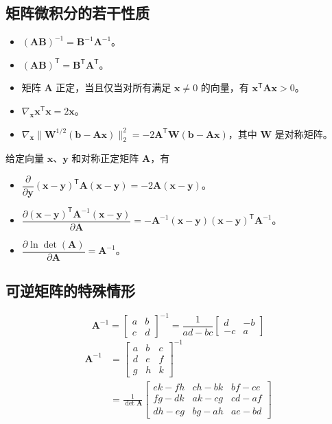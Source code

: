\subsection{矩阵微积分的若干性质}
\begin{itemize}
\item $(\mathbf{A}\mathbf{B})^{-1}=\mathbf{B}^{-1}\mathbf{A}^{-1}$。
\item $(\mathbf{A}\mathbf{B})^{\mathsf T}=\mathbf{B}^{\mathsf T}\mathbf{A}^{\mathsf T}$。
\item 矩阵 $\mathbf{A}$ 正定，当且仅当对所有满足 $\mathbf{x}\ne0$ 的向量，有 $\mathbf{x}^{\mathsf T}\mathbf{A}\mathbf{x}>0$。
\item $\nabla_{\mathbf{x}}\mathbf{x}^{\mathsf T}\mathbf{x}=2\mathbf{x}$。
\item $\nabla_{\mathbf{x}}\lVert\mathbf{W}^{1/2}(\mathbf{b}-\mathbf{A}\mathbf{x})\rVert_2^2
   =-2\mathbf{A}^{\mathsf T}\mathbf{W}(\mathbf{b}-\mathbf{A}\mathbf{x})$，其中 $\mathbf{W}$ 是对称矩阵。
\end{itemize}
给定向量 $\mathbf{x}$、$\mathbf{y}$ 和对称正定矩阵 $\mathbf{A}$，有
\begin{itemize}
\item $\dfrac{\partial}{\partial\mathbf{y}}(\mathbf{x}-\mathbf{y})^{\mathsf T}\mathbf{A}(\mathbf{x}-\mathbf{y})=-2\mathbf{A}(\mathbf{x}-\mathbf{y})$。
\item $\dfrac{\partial(\mathbf{x}-\mathbf{y})^{\mathsf T}\mathbf{A}^{-1}(\mathbf{x}-\mathbf{y})}
             {\partial\mathbf{A}}
       =-\mathbf{A}^{-1}(\mathbf{x}-\mathbf{y})(\mathbf{x}-\mathbf{y})^{\mathsf T}\mathbf{A}^{-1}$。
\item $\dfrac{\partial\ln\det(\mathbf{A})}{\partial\mathbf{A}}=\mathbf{A}^{-1}$。
\end{itemize}

\subsection{可逆矩阵的特殊情形}
\[
\mathbf{A}^{-1}
 =\begin{bmatrix}a&b\\c&d\end{bmatrix}^{-1}
 =\frac{1}{ad-bc}\begin{bmatrix}d&-b\\-c&a\end{bmatrix}
\]
\[
\begin{aligned}
\mathbf{A}^{-1}
 &=\begin{bmatrix}a&b&c\\d&e&f\\g&h&k\end{bmatrix}^{-1}\\
 &=\frac{1}{\det\mathbf{A}}
 \begin{bmatrix}
 ek-fh & ch-bk & bf-ce\\
 fg-dk & ak-cg & cd-af\\
 dh-eg & bg-ah & ae-bd
 \end{bmatrix}
\end{aligned}
\]
